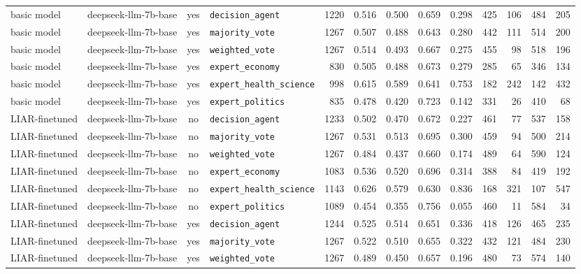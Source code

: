 \begin{landscape}
\begin{longtable}{@{}l p{3.2cm} c l r r r r r r r r r@{}}
basic model & deepseek-llm-7b-base & yes & \texttt{decision\_agent} & 1220 & 0.516 & 0.500 & 0.659 & 0.298 & 425 & 106 & 484 & 205\\
basic model & deepseek-llm-7b-base & yes & \texttt{majority\_vote} & 1267 & 0.507 & 0.488 & 0.643 & 0.280 & 442 & 111 & 514 & 200\\
basic model & deepseek-llm-7b-base & yes & \texttt{weighted\_vote} & 1267 & 0.514 & 0.493 & 0.667 & 0.275 & 455 & 98 & 518 & 196\\
basic model & deepseek-llm-7b-base & yes & \texttt{expert\_economy} & 830 & 0.505 & 0.488 & 0.673 & 0.279 & 285 & 65 & 346 & 134\\
basic model & deepseek-llm-7b-base & yes & \texttt{expert\_health\_science} & 998 & 0.615 & 0.589 & 0.641 & 0.753 & 182 & 242 & 142 & 432\\
basic model & deepseek-llm-7b-base & yes & \texttt{expert\_politics} & 835 & 0.478 & 0.420 & 0.723 & 0.142 & 331 & 26 & 410 & 68\\
\midrule
LIAR-finetuned & deepseek-llm-7b-base & no & \texttt{decision\_agent} & 1233 & 0.502 & 0.470 & 0.672 & 0.227 & 461 & 77 & 537 & 158\\
LIAR-finetuned & deepseek-llm-7b-base & no & \texttt{majority\_vote} & 1267 & 0.531 & 0.513 & 0.695 & 0.300 & 459 & 94 & 500 & 214\\
LIAR-finetuned & deepseek-llm-7b-base & no & \texttt{weighted\_vote} & 1267 & 0.484 & 0.437 & 0.660 & 0.174 & 489 & 64 & 590 & 124\\
LIAR-finetuned & deepseek-llm-7b-base & no & \texttt{expert\_economy} & 1083 & 0.536 & 0.520 & 0.696 & 0.314 & 388 & 84 & 419 & 192\\
LIAR-finetuned & deepseek-llm-7b-base & no & \texttt{expert\_health\_science} & 1143 & 0.626 & 0.579 & 0.630 & 0.836 & 168 & 321 & 107 & 547\\
LIAR-finetuned & deepseek-llm-7b-base & no & \texttt{expert\_politics} & 1089 & 0.454 & 0.355 & 0.756 & 0.055 & 460 & 11 & 584 & 34\\
LIAR-finetuned & deepseek-llm-7b-base & yes & \texttt{decision\_agent} & 1244 & 0.525 & 0.514 & 0.651 & 0.336 & 418 & 126 & 465 & 235\\
LIAR-finetuned & deepseek-llm-7b-base & yes & \texttt{majority\_vote} & 1267 & 0.522 & 0.510 & 0.655 & 0.322 & 432 & 121 & 484 & 230\\
LIAR-finetuned & deepseek-llm-7b-base & yes & \texttt{weighted\_vote} & 1267 & 0.489 & 0.450 & 0.657 & 0.196 & 480 & 73 & 574 & 140\\

\end{longtable}
\end{landscape}
